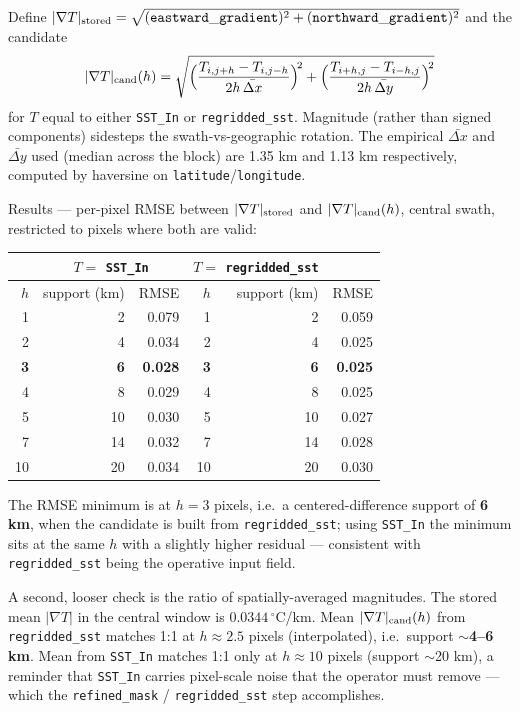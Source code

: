 \documentclass[11pt]{article}
\begin{document}
Define $|\nabla T|_{\rm stored} = \sqrt{
(\mathtt{eastward\_gradient})^2 +
(\mathtt{northward\_gradient})^2}$ and the candidate
\[
|\nabla T|_{\rm cand}(h) = \sqrt{
\Big(\frac{T_{i,j+h}-T_{i,j-h}}{2h\,\bar{\Delta x}}\Big)^{\!2}
+
\Big(\frac{T_{i+h,j}-T_{i-h,j}}{2h\,\bar{\Delta y}}\Big)^{\!2}}
\]
for $T$ equal to either \texttt{SST\_In} or
\texttt{regridded\_sst}. Magnitude (rather than signed components)
sidesteps the swath-vs-geographic rotation. The empirical
$\bar{\Delta x}$ and $\bar{\Delta y}$ used (median across the
block) are 1.35 km and 1.13 km respectively, computed by
haversine on \texttt{latitude}/\texttt{longitude}.

Results --- per-pixel RMSE between
$|\nabla T|_{\rm stored}$ and $|\nabla T|_{\rm cand}(h)$, central
swath, restricted to pixels where both are valid:

\begin{center}
\begin{tabular}{@{}rrr|rrr@{}}
\toprule
& \multicolumn{2}{c|}{$T = $ \texttt{SST\_In}} & \multicolumn{2}{c}{$T = $ \texttt{regridded\_sst}} \\
\midrule
$h$ & support (km) & RMSE & $h$ & support (km) & RMSE \\
\midrule
1 & 2  & 0.079 & 1 & 2  & 0.059 \\
2 & 4  & 0.034 & 2 & 4  & 0.025 \\
\textbf{3} & \textbf{6}  & \textbf{0.028} & \textbf{3} & \textbf{6}  & \textbf{0.025} \\
4 & 8  & 0.029 & 4 & 8  & 0.025 \\
5 & 10 & 0.030 & 5 & 10 & 0.027 \\
7 & 14 & 0.032 & 7 & 14 & 0.028 \\
10 & 20 & 0.034 & 10 & 20 & 0.030 \\
\bottomrule
\end{tabular}
\end{center}

The RMSE minimum is at $h = 3$ pixels, i.e.\ a centered-difference
support of \textbf{6 km}, when the candidate is built from
\texttt{regridded\_sst}; using \texttt{SST\_In} the minimum sits at
the same $h$ with a slightly higher residual --- consistent with
\texttt{regridded\_sst} being the operative input field.

A second, looser check is the ratio of spatially-averaged
magnitudes. The stored mean $|\nabla T|$ in the central window is
$0.0344\,^\circ$C/km. Mean
$|\nabla T|_{\rm cand}(h)$ from \texttt{regridded\_sst} matches
1:1 at $h \approx 2.5$ pixels (interpolated), i.e.\ support
\textbf{$\sim$4--6 km}. Mean from \texttt{SST\_In} matches 1:1
only at $h \approx 10$ pixels (support $\sim$20 km), a reminder
that \texttt{SST\_In} carries pixel-scale noise that the operator
must remove --- which the
\texttt{refined\_mask} / \texttt{regridded\_sst} step
accomplishes.
\end{document}
